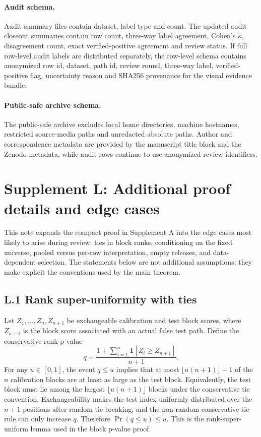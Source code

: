 \documentclass[11pt]{article}
\newcommand{\ind}{\mathbf 1}
\begin{document}
\paragraph{Audit schema.}
Audit summary files contain dataset, label type and count.
The updated audit closeout summaries contain row count, three-way label agreement, Cohen's \(\kappa\), disagreement count, exact verified-positive agreement and review status.
If full row-level audit labels are distributed separately, the row-level schema contains anonymized row id, dataset, path id, review round, three-way label, verified-positive flag, uncertainty reason and SHA256 provenance for the visual evidence bundle.

\paragraph{Public-safe archive schema.}
The public-safe archive excludes local home directories, machine hostnames, restricted source-media paths and unredacted absolute paths.
Author and correspondence metadata are provided by the manuscript title block and the Zenodo metadata, while audit rows continue to use anonymized review identifiers.

\clearpage

\section*{Supplement L: Additional proof details and edge cases}

This note expands the compact proof in Supplement A into the edge cases most likely to arise during review: ties in block ranks, conditioning on the fixed universe, pooled versus per-row interpretation, empty releases, and data-dependent selection.
The statements below are not additional assumptions; they make explicit the conventions used by the main theorem.

\subsection*{L.1 Rank super-uniformity with ties}

Let \(Z_1,\ldots,Z_n,Z_{n+1}\) be exchangeable calibration and test block scores, where \(Z_{n+1}\) is the block score associated with an actual false test path.
Define the conservative rank p-value
\[
q=\frac{1+\sum_{i=1}^n\ind[Z_i\ge Z_{n+1}]}{n+1}.
\]
For any \(u\in[0,1]\), the event \(q\le u\) implies that at most \(\lfloor u(n+1)\rfloor-1\) of the \(n\) calibration blocks are at least as large as the test block.
Equivalently, the test block must lie among the largest \(\lfloor u(n+1)\rfloor\) blocks under the conservative tie convention.
Exchangeability makes the test index uniformly distributed over the \(n+1\) positions after random tie-breaking, and the non-random conservative tie rule can only increase \(q\).
Therefore \(\Pr(q\le u)\le u\).
This is the rank-super-uniform lemma used in the block p-value proof.
\end{document}
